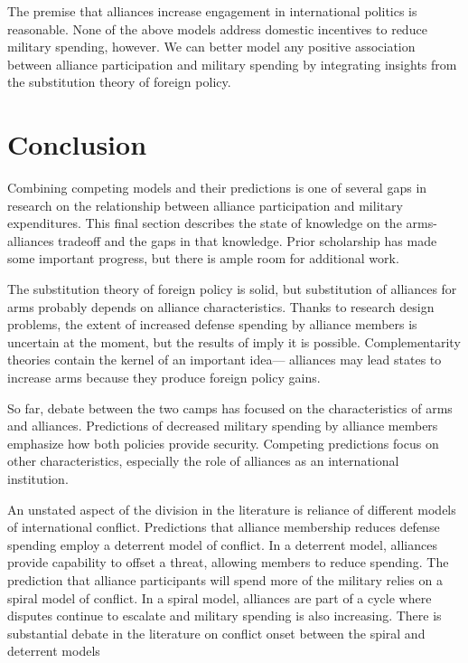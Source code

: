 \documentclass[12pt]{article}
\begin{document}
The premise that alliances increase engagement in international politics is reasonable. 
None of the above models address domestic incentives to reduce military spending, however. 
We can better model any positive association between alliance participation and military spending by integrating insights from the substitution theory of foreign policy. 




\section{Conclusion}


Combining competing models and their predictions is one of several gaps in research on the relationship between alliance participation and military expenditures. 
This final section describes the state of knowledge on the arms-alliances tradeoff and the gaps in that knowledge. 
Prior scholarship has made some important progress, but there is ample room for additional work. 


The substitution theory of foreign policy is solid, but substitution of alliances for arms probably depends on alliance characteristics. 
Thanks to research design problems, the extent of increased defense spending by alliance members is uncertain at the moment, but the results of \citet{Horowitzetal2017} imply it is possible. 
Complementarity theories contain the kernel of an important idea--- alliances may lead states to increase arms because they produce foreign policy gains. 


So far, debate between the two camps has focused on the characteristics of arms and alliances. 
Predictions of decreased military spending by alliance members emphasize how both policies provide security. 
Competing predictions focus on other characteristics, especially the role of alliances as an international institution. 


An unstated aspect of the division in the literature is reliance of different models of international conflict. 
Predictions that alliance membership reduces defense spending employ a deterrent model of conflict. 
In a deterrent model, alliances provide capability to offset a threat, allowing members to reduce spending.
The prediction that alliance participants will spend more of the military relies on a spiral model of conflict.
In a spiral model, alliances are part of a cycle where disputes continue to escalate and military spending is also increasing. 
There is substantial debate in the literature on conflict onset between the spiral and deterrent models \cite{Jervis1978, Reiter1995, SeneseVasquez2008, JacksonMorelli2008, JohnsonLeeds2011, Kenwicketal2015}
\end{document}
